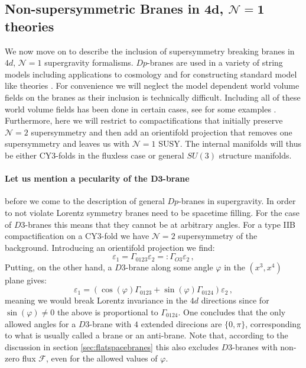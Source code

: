 \documentclass[a4paper,12pt]{report}
\newcommand{\be}{\begin{equation}}
\newcommand{\ee}{\end{equation}}
\begin{document}
\subsection[Non-supersymmetric Branes in $4d$, $\mathcal{N}=1$ theories]{Non-supersymmetric Branes in $\mathbf{4d}$, $\mathbf{\mathcal{N}=1}$ theories}
We now move on to describe the inclusion of supersymmetry breaking branes in $4d$, $\mathcal{N}=1$ supergravity formalisms. $Dp$-branes are used in a variety of string models including applications to cosmology \cite{Grana:2005jc,Douglas:2006es} and for constructing standard model like theories \cite{Blumenhagen:2006ci,Blumenhagen:2005mu}. For convenience we will neglect the model dependent world volume fields on the branes as their inclusion is technically difficult. Including all of these world volume fields has been done in certain cases, see for some examples \cite{Vercnocke:2016fbt,Kallosh:2016aep,Kachru:2003aw,Aalsma:2017ulu,GarciadelMoral:2017vnz,Cribiori:2019hod}. Furthermore, here we will restrict to compactifications that initially preserve $\mathcal{N}=2$ supersymmetry and then add an orientifold projection that removes one supersymmetry and leaves us with $\mathcal{N}=1$ SUSY. The internal manifolds will thus be either CY3-folds in the fluxless case or general $SU(3)$ structure manifolds. 
\paragraph{Let us mention a pecularity of the $\mathbf{D3}$-brane} before we come to the description of general $Dp$-branes in supergravity. In order to not violate Lorentz symmetry branes need to be spacetime filling. For the case of $D3$-branes this means that they cannot be at arbitrary angles. For a type IIB compactification on a CY3-fold we have $\mathcal{N}=2$ supersymmetry of the background. Introducing an orientifold projection we find:
\be
\varepsilon_1 = \Gamma_{0123}\varepsilon_2 =: \Gamma_{O3} \varepsilon_2\,,
\ee
Putting, on the other hand, a $D3$-brane along some angle $\varphi$ in the $(x^3,x^4)$ plane gives:
\be 
\varepsilon_1 = \left( \cos (\varphi) \Gamma_{0123} + \sin (\varphi) \Gamma_{0124} \right) \varepsilon_2\,,
\ee
meaning we would break Lorentz invariance in the $4d$ directions since for $\sin (\varphi)\neq0$ the above is proportional to $\Gamma_{0124}$. One concludes that the only allowed angles for a $D3$-brane with $4$ extended direcions are $\{0,\pi\}$, corresponding to what is usually called a brane or an anti-brane. Note that, according to the discussion in section \ref{sec:flatspacebranes} this also excludes $D3$-branes with non-zero flux $\mathcal{F}$, even for the allowed values of $\varphi$.
\end{document}
